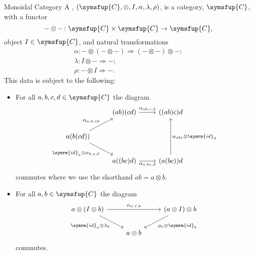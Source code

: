 \documentclass[fleqn]{NotesClass}
\newcommand{\cat}[1]{\symsfup{#1}}
\newcommand{\id}{\symrm{id}}
\newcommand{\natTrans}{\Rightarrow}
\begin{document}
    \begin{dfn}{Monoidal Category}{}
        A , \((\cat{C}, \otimes, I, \alpha, \lambda, \rho)\), is a category, \(\cat{C}\), with a functor
        \begin{equation}
            - \otimes - \colon \cat{C} \times \cat{C} \to \cat{C},
        \end{equation}
        object \(I \in \cat{C}\), and natural transformations
        \begin{gather}
            \alpha \colon - \otimes (- \otimes -) \natTrans (- \otimes -) \otimes -;\\
            \lambda \colon I \otimes - \natTrans -;\\
            \rho \colon - \otimes I \natTrans -.
        \end{gather}
        This data is subject to the following:
        \begin{itemize}
            \item For all \(a, b, c, d \in \cat{C}\) the diagram
            \begin{equation}
                \begin{tikzcd}
                    & (ab)(cd) \arrow[r, "{\alpha_{ab,c,d}}"] & ((ab)c)d\\
                    a(b(cd)) \arrow[ur, "{\alpha_{a,b,cd}}"] \arrow[dr, "{\id_a \otimes \alpha_{b,c,d}}"']\\
                    & a((bc)d) \arrow[r, "{\alpha_{a,bc,d}}"'] & (a(bc))d \arrow[uu, "{\alpha_{abc} \otimes \id_d}"']
                \end{tikzcd}
            \end{equation}
            commutes where we use the shorthand \(ab = a \otimes b\).
            \item For all \(a, b \in \cat{C}\) the diagram
            \begin{equation}
                \begin{tikzcd}
                    a \otimes (I \otimes b) \arrow[rr, "{\alpha_{a,I,b}}"] \arrow[dr, "\id_a \otimes \lambda_b"'] && (a \otimes I) \otimes b \arrow[dl, "\rho_a \otimes \id_b"]\\
                    & a \otimes b
                \end{tikzcd}
            \end{equation}
            commutes.
        \end{itemize}
    \end{dfn}
    
\end{document}
